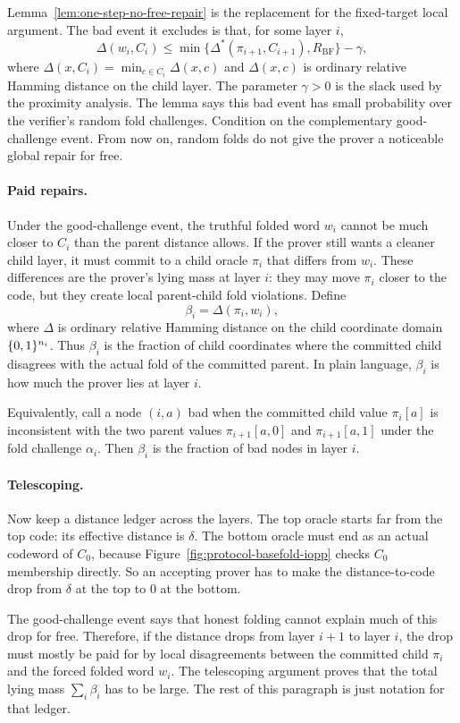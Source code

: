 Lemma~\ref{lem:one-step-no-free-repair} is the replacement for the fixed-target
local argument.  The bad event it excludes is that, for some layer $i$,
\[
  \Delta(w_i,C_i)
  \le
  \min\{\Delta^*(\pi_{i+1},C_{i+1}),R_{\mathrm{BF}}\}-\gamma,
\]
where $\Delta(x,C_i)=\min_{c\in C_i}\Delta(x,c)$ and $\Delta(x,c)$ is ordinary
relative Hamming distance on the child layer.  The parameter $\gamma>0$ is the
slack used by the proximity analysis.  The lemma says this bad event has small
probability over the verifier's random fold challenges.
Condition on the complementary good-challenge event.  From now on, random folds
do not give the prover a noticeable global repair for free.

\paragraph{Paid repairs.}
Under the good-challenge event, the truthful folded word $w_i$ cannot be much
closer to $C_i$ than the parent distance allows.  If the prover still wants a
cleaner child layer, it must commit to a child oracle $\pi_i$ that differs from
$w_i$.  These differences are the prover's lying mass at layer $i$: they may
move $\pi_i$ closer to the code, but they create local parent-child fold
violations.  Define
\[
  \beta_i
  =
  \Delta(\pi_i,w_i),
\]
where $\Delta$ is ordinary relative Hamming distance on the child coordinate
domain $\{0,1\}^{n_i}$.  Thus $\beta_i$ is the fraction of child coordinates where the
committed child disagrees with the actual fold of the committed parent.  In
plain language, $\beta_i$ is how much the prover lies at layer $i$.

Equivalently, call a node $(i,a)$ bad when the committed child value
$\pi_i[a]$ is inconsistent with the two parent values
$\pi_{i+1}[a,0]$ and $\pi_{i+1}[a,1]$ under the fold challenge $\alpha_i$.
Then $\beta_i$ is the fraction of bad nodes in layer $i$.

\paragraph{Telescoping.}
Now keep a distance ledger across the layers.  The top oracle starts far from
the top code: its effective distance is $\delta$.  The bottom oracle must end as
an actual codeword of $C_0$, because Figure~\ref{fig:protocol-basefold-iopp}
checks $C_0$ membership directly.  So an accepting prover has to make the
distance-to-code drop from $\delta$ at the top to $0$ at the bottom.

The good-challenge event says that honest folding cannot explain much of this
drop for free.  Therefore, if the distance drops from layer $i+1$ to layer $i$,
the drop must mostly be paid for by local disagreements between the committed
child $\pi_i$ and the forced folded word $w_i$.  The telescoping argument proves
that the total lying mass $\sum_i\beta_i$ has to be large.  The rest of this
paragraph is just notation for that ledger.


